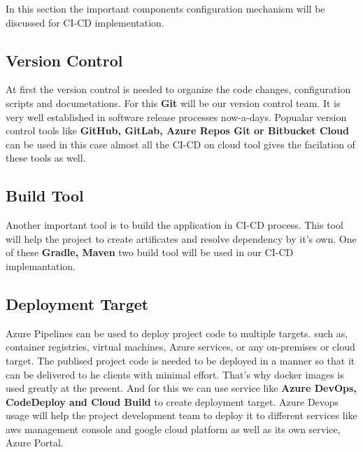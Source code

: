 In this section the important components configuration mechanism will be discussed for CI-CD implementation.
\subsection{Version Control}
At first the version control is needed to organize the code changes, configuration scripts and documetations. For this \textbf{Git} will be our version control team. It is very well established in software release processes now-a-days. Popualar version control tools like \textbf{GitHub, GitLab, Azure Repos Git or Bitbucket Cloud} can be used in this case almost all the CI-CD on cloud tool gives the facilation of these tools as well.
\subsection{Build Tool}
Another important tool is to build the application in CI-CD process. This tool will help the project to create artificates and resolve dependency by it's own. One of these \textbf{Gradle, Maven} two build tool will be used in our CI-CD implemantation.
\subsection{Deployment Target}
Azure Pipelines can be used to deploy project code to multiple targets. such as, container registries, virtual machines, Azure services, or any on-premises or cloud target.
The publised project code is needed to be deployed in a manner so that it can be delivered to he clients with minimal effort. That's why docker images is used greatly at the present. And for this we can use service like \textbf{Azure DevOps, CodeDeploy and Cloud Build} to create deployment target. Azure Devops usage will help the project development team to deploy it to different services like aws management console and google cloud platform as well as its own service, Azure Portal.
